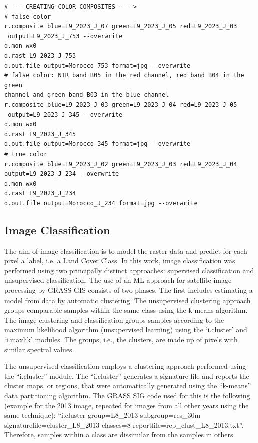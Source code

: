 \documentclass[geomatics,article,accept,pdftex,oneauthor]{Definitions/mdpi}
\begin{document}
\begin{footnotesize}
\begin{verbatim}
# ----CREATING COLOR COMPOSITES----->
# false color
r.composite blue=L9_2023_J_07 green=L9_2023_J_05 red=L9_2023_J_03
 output=L9_2023_J_753 --overwrite
d.mon wx0
d.rast L9_2023_J_753
d.out.file output=Morocco_753 format=jpg --overwrite
# false color: NIR band B05 in the red channel, red band B04 in the green 
channel and green band B03 in the blue channel
r.composite blue=L9_2023_J_03 green=L9_2023_J_04 red=L9_2023_J_05
 output=L9_2023_J_345 --overwrite
d.mon wx0
d.rast L9_2023_J_345
d.out.file output=Morocco_345 format=jpg --overwrite
# true color
r.composite blue=L9_2023_J_02 green=L9_2023_J_03 red=L9_2023_J_04
output=L9_2023_J_234 --overwrite
d.mon wx0
d.rast L9_2023_J_234
d.out.file output=Morocco_J_234 format=jpg --overwrite
\end{verbatim}
\end{footnotesize}

\subsection{{Image Classification}}
The aim of {image classification} is to model the {raster }data and predict for each pixel a label, i.e. a Land Cover Class. {In this work, image classification was performed using} two {principally distinct approaches}: supervised classification and unsupervised classification. The use of an ML approach for satellite image processing by GRASS GIS consists of two phases. The first {includes} estimating a model from data by automatic clustering. The unsupervised clustering approach groups comparable samples within the same class using the k-means algorithm. The image clustering and classification groups samples according to the maximum likelihood algorithm (unsupervised learning) using the `i.cluster' and `i.maxlik' modules. The groups, i.e., the clusters, are made up of pixels with similar spectral values. 

The unsupervised classification employs a clustering approach performed using the ``i.cluster'' module. The ``i.cluster'' generates a signature file and reports the cluster maps, or regions, that were automatically generated using the ``k-means'' data partitioning algorithm. The GRASS SIG code used for this is the following (example for the 2013 image, repeated for images from all other years using the same technique): ``i.cluster group=L8\_2013 subgroup=res\_30m signaturefile=cluster\_L8\_2013 classes=8 reportfile=rep\_clust\_L8\_2013.txt''. Therefore, samples within a class are dissimilar from the samples in others.
\end{document}
